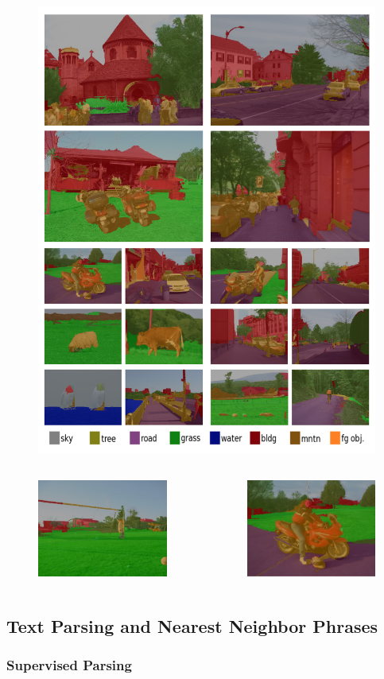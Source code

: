 \documentclass{beamer}
\begin{document}
\frame
{
  \begin{figure}[ht]  
  	\begin{center}
  		\includegraphics[height=3.in]{images/ex1.png}   
	\end{center}
  \end{figure}
}
\frame
{
  \begin{columns}
  \begin{figure}[ht]  
	  \begin{center}
		  \includegraphics[width=2.1in]{images/ex1_ext.png}   
	  \end{center}   
  \end{figure}
  \begin{figure}[ht]
	  \begin{center}
		  \includegraphics[width=2.1in]{images/ex1_ext2.png} 
	  \end{center}
  \end{figure}
  \end{columns}
}
\subsection{Text Parsing and Nearest Neighbor Phrases}
\frame
{
  \frametitle{Supervised Parsing}
}
\end{document}

